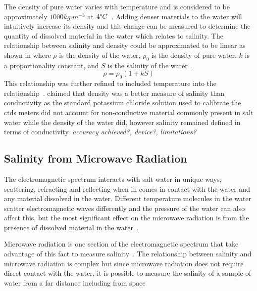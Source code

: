 The density of pure water varies with temperature and is considered to be approximately $1000 kg.m^{-3}$ at $4\degree C$~\cite{USGS_water_density_2018}.
Adding denser materials to the water will intuitively increase its density and this change can be measured to determine the quantity of dissolved material in the water which relates to salinity.
The relationship between salinity and density could be approximated to be linear as shown in  where $\rho$ is the density of the water, $\rho_0$ is the density of pure water, $k$ is a proportionality constant, and $S$ is the salinity of the water~\cite{kjerfve_salinity_measurement_overview_1983}\cite{uow_oceanography_research_1966}.
\begin{equation}\label{eqn:salinity-density}
    \rho = \rho_0(1 + kS)
\end{equation}
This relationship was further refined to included temperature into the relationship~\cite{schmidt_density_salinity_relation_2018}.
 claimed that density was a better measure of salinity than conductivity as the standard potassium chloride solution used to calibrate the \glspl{ctd} meters did not account for non-conductive material commonly present in salt water while the density of the water did, however salinity remained defined in terms of conductivity.
\textit{accuracy achieved?, device?, limitations?} 

\subsection{Salinity from Microwave Radiation}

The electromagnetic spectrum interacts with salt water in unique ways, scattering, refracting and reflecting when in comes in contact with the water and any material dissolved in the water.
Different temperature molecules in the water scatter electromagnetic waves differently and the pressure of the water can also affect this, but the most significant effect on the microwave radiation is from the presence of dissolved material in the water~\cite{swift_considerations_for_microwave_salinity_1983}.

Microwave radiation is one section of the electromagnetic spectrum that take advantage of this fact to measure salinity~\cite{swift_considerations_for_microwave_salinity_1983}.
The relationship between salinity and microwave radiation is complex but since microwave radiation does not require direct contact with the water, it is possible to measure the salinity of a sample of water from a far distance including from space~\cite{gabarro_microwave_salinity_2004}

